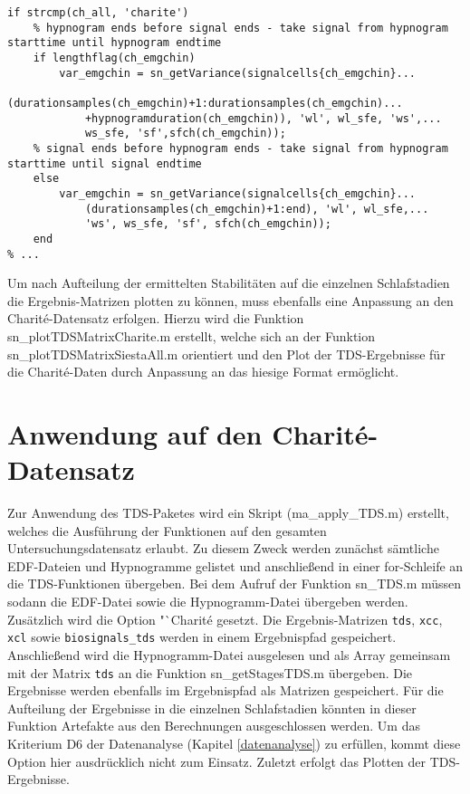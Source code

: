 \begin{lstlisting}[caption={Berechnung der Zeitreihen für den Charit\'{e}-Datensatz in der Funktion sn\_TDS.m}, label={lst:zeitreihen}]
% ...
if strcmp(ch_all, 'charite')
    % hypnogram ends before signal ends - take signal from hypnogram starttime until hypnogram endtime
    if lengthflag(ch_emgchin)
        var_emgchin = sn_getVariance(signalcells{ch_emgchin}...
            (durationsamples(ch_emgchin)+1:durationsamples(ch_emgchin)...
            +hypnogramduration(ch_emgchin)), 'wl', wl_sfe, 'ws',...
            ws_sfe, 'sf',sfch(ch_emgchin));
    % signal ends before hypnogram ends - take signal from hypnogram starttime until signal endtime    
    else
        var_emgchin = sn_getVariance(signalcells{ch_emgchin}...
            (durationsamples(ch_emgchin)+1:end), 'wl', wl_sfe,...
            'ws', ws_sfe, 'sf', sfch(ch_emgchin));
    end
% ...
\end{lstlisting}

Um nach Aufteilung der ermittelten Stabilitäten auf die einzelnen Schlafstadien die Ergebnis-Matrizen plotten zu können, muss ebenfalls eine Anpassung an den Charit\'{e}-Datensatz erfolgen. Hierzu wird die Funktion sn\_plotTDSMatrixCharite.m erstellt, welche sich an der Funktion sn\_plotTDSMatrixSiestaAll.m orientiert und den Plot der \acs{TDS}-Ergebnisse für die Charit\'{e}-Daten durch Anpassung an das hiesige Format ermöglicht.

\section{Anwendung auf den Charit\'{e}-Datensatz}

Zur Anwendung des \acs{TDS}-Paketes wird ein Skript (ma\_apply\_TDS.m) erstellt, welches die Ausführung der Funktionen auf den gesamten Untersuchungsdatensatz erlaubt. Zu diesem Zweck werden zunächst sämtliche \acs{EDF}-Dateien und Hypnogramme gelistet und anschließend in einer for-Schleife an die \acs{TDS}-Funktionen übergeben. Bei dem Aufruf der Funktion sn\_TDS.m müssen sodann die \acs{EDF}-Datei sowie die Hypnogramm-Datei übergeben werden. Zusätzlich wird die Option "`Charit\'{e} gesetzt. Die Ergebnis-Matrizen \texttt{tds}, \texttt{xcc}, \texttt{xcl} sowie \texttt{biosignals\_tds} werden in einem Ergebnispfad gespeichert. Anschließend wird die Hypnogramm-Datei ausgelesen und als Array gemeinsam mit der Matrix \texttt{tds} an die Funktion sn\_getStagesTDS.m übergeben. Die Ergebnisse werden ebenfalls im Ergebnispfad als Matrizen gespeichert. Für die Aufteilung der Ergebnisse in die einzelnen Schlafstadien könnten in dieser Funktion Artefakte aus den Berechnungen ausgeschlossen werden. Um das Kriterium D6 der Datenanalyse (Kapitel \ref{datenanalyse}) zu erfüllen, kommt diese Option hier ausdrücklich nicht zum Einsatz. Zuletzt erfolgt das Plotten der \acs{TDS}-Ergebnisse.\\

